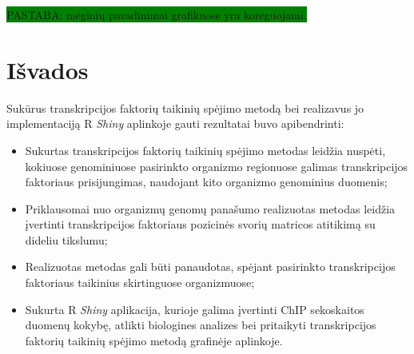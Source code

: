 \documentclass[12pt]{article}
\begin{document}
\colorbox{green}{PASTABA: mėginių pavadinimai grafikuose yra koreguojami.}


\section{Išvados}
Sukūrus transkripcijos faktorių taikinių spėjimo metodą bei realizavus jo
implementaciją R \emph{Shiny} aplinkoje gauti rezultatai buvo apibendrinti:

\begin{itemize}
    \item Sukurtas transkripcijos faktorių taikinių spėjimo metodas leidžia
        nuspėti, kokiuose genominiuose pasirinkto organizmo regionuose
        galimas transkripcijos faktoriaus prisijungimas, naudojant kito
        organizmo genominius duomenis;
    \item Priklausomai nuo organizmų genomų panašumo realizuotas metodas
        leidžia įvertinti transkripcijos faktoriaus pozicinės svorių matricos
        atitikimą su dideliu tikslumu;
    \item Realizuotas metodas gali būti panaudotas, spėjant pasirinkto
        transkripcijos faktoriaus taikinius skirtinguose organizmuose;
    \item Sukurta R \emph{Shiny} aplikacija, kurioje galima įvertinti ChIP
        sekoskaitos duomenų kokybę, atlikti biologines analizes bei pritaikyti
        transkripcijos faktorių taikinių spėjimo metodą grafinėje aplinkoje.
\end{itemize}

\newpage

\end{document}
